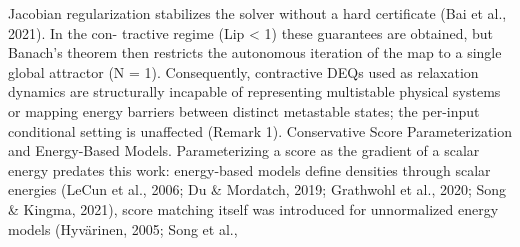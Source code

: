 \documentclass{article}
\begin{document}
Jacobian regularization stabilizes the solver without a hard certificate (Bai et al., 2021). In the con-
tractive regime (Lip < 1) these guarantees are obtained, but Banach's theorem then restricts the
autonomous iteration of the map to a single global attractor (N = 1). Consequently, contractive
DEQs used as relaxation dynamics are structurally incapable of representing multistable physical
systems or mapping energy barriers between distinct metastable states; the per-input conditional
setting is unaffected (Remark 1).
Conservative Score Parameterization and Energy-Based Models.
Parameterizing a score as the
gradient of a scalar energy predates this work: energy-based models define densities through scalar
energies (LeCun et al., 2006; Du \& Mordatch, 2019; Grathwohl et al., 2020; Song \& Kingma, 2021),
score matching itself was introduced for unnormalized energy models (Hyv\"arinen, 2005; Song et al.,
\end{document}
